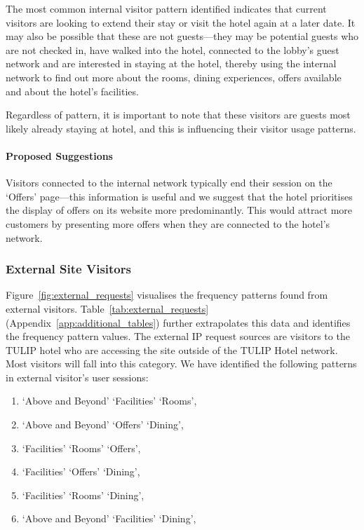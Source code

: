 The most common internal visitor pattern identified indicates that current visitors are looking to extend their stay or visit the hotel again at a later date. It may also be possible that these are not guests---they may be potential guests who are not checked in, have walked into the hotel, connected to the lobby's guest network and are interested in staying at the hotel, thereby using the internal network to find out more about the rooms, dining experiences, offers available and about the hotel's facilities.

Regardless of pattern, it is important to note that these visitors are guests most likely already staying at hotel, and this is influencing their visitor usage patterns.

\paragraph{Proposed Suggestions} Visitors connected to the internal network typically end their session on the `Offers' page---this information is useful and we suggest that the hotel prioritises the display of offers on its website more predominantly. This would attract more customers by presenting more offers when they are connected to the hotel's network.


\subsubsection{External Site Visitors}
\label{sec:results:ip_source:external}

Figure~\ref{fig:external_requests} visualises the frequency patterns found from external visitors. Table~\ref{tab:external_requests} (Appendix~\ref{app:additional_tables}) further extrapolates this data and identifies the frequency pattern values. The external IP request sources are visitors to the TULIP hotel who are accessing the site outside of the TULIP Hotel network. Most visitors will fall into this category. We have identified the following patterns in external visitor's user sessions:

\begin{enumerate}
  \item `Above and Beyond' \ra{} `Facilities' \ra{} `Rooms',
  \item `Above and Beyond' \ra{} `Offers' \ra{} `Dining',
  \item `Facilities' \ra{} `Rooms' \ra{} `Offers',
  \item `Facilities' \ra{} `Offers' \ra{} `Dining',
  \item `Facilities' \ra{} `Rooms' \ra{} `Dining',
  \item `Above and Beyond' \ra{} `Facilities' \ra{} `Dining',
\end{enumerate}


